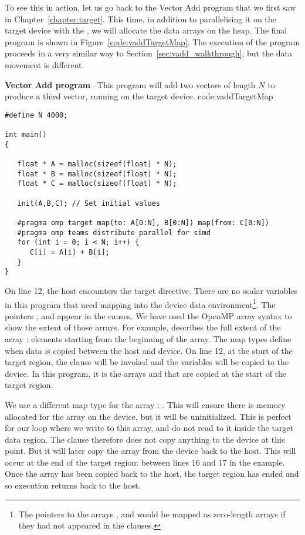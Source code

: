 To see this in action, let us go back to the Vector Add program that we first saw in Chapter~\ref{chapter:target}.
This time, in addition to parallelising it on the target device with the \BUD, we will allocate the data arrays on the heap.
The final program is shown in Figure~\ref{code:vaddTargetMap}.
The execution of the program proceeds in a very similar way to Section~\ref{sec:vadd_walkthrough}, but the data movement is different.

\begin{CodeExample}%
{\textbf{Vector Add program} --\small This program will add two vectors of length $N$
to produce a third vector, running on the target device.
}%
{code:vaddTargetMap}
\begin{lstlisting}
#define N 4000;

int main()
{

   float * A = malloc(sizeof(float) * N);
   float * B = malloc(sizeof(float) * N);
   float * C = malloc(sizeof(float) * N);

   init(A,B,C); // Set initial values

   #pragma omp target map(to: A[0:N], B[0:N]) map(from: C[0:N])
   #pragma omp teams distribute parallel for simd
   for (int i = 0; i < N; i++) {
      C[i] = A[i] + B[i];
   }
}	  
\end{lstlisting}
\end{CodeExample}

On line 12, the host encounters the target directive.
There are no scalar variables in this program that need mapping into the device data environment\footnote{The pointers to the arrays ,  and  would be mapped as zero-length arrays if they had not appeared in the  clauses.}.
The pointers ,  and  appear in the  causes.
We have used the OpenMP array syntax to show the extent of those arrays.
For example,  describes the full extent of the array :  elements starting from the beginning of the array.
The map types define when data is copied between the host and device.
On line 12, at the start of the target region, the  clause will be invoked and the variables will be copied to the device.
In this program, it is the arrays  and  that are copied at the start of the target region.

We use a different map type for the array : .
This will ensure there is memory allocated for the array  on the device, but it will be uninitialized.
This is perfect for our loop where we write to this array, and do not read to it inside the target data region.
The  clause therefore does not copy anything to the device at this point.
But it will later copy the array from the device back to the host.
This will occur at the end of the target region: between lines 16 and 17 in the example.
Once the array  has been copied back to the host, the target region has ended and so execution returns back to the host.


